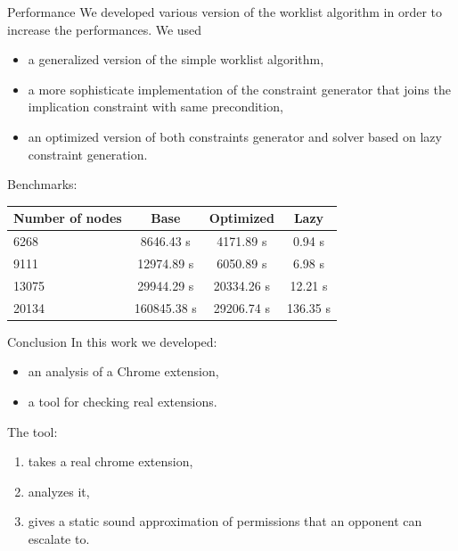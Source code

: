 \documentclass[11pt]{beamer}
\begin{document}
\begin{frame}{Performance}
We developed various version of the worklist algorithm in order to increase the performances. We used
\begin{itemize}
\item a generalized version of the simple worklist algorithm,
\item a more sophisticate implementation of the constraint generator that joins the implication constraint with same precondition,
\item an optimized version of both constraints generator and solver based on lazy constraint generation.
\end{itemize}

Benchmarks:
\begin{center}
\begin{tabular}{|l|c|c|c|}
\hline
Number of nodes & Base & Optimized & Lazy\\
\hline
6268 & 8646.43 s & 4171.89 s & 0.94 s\\
\hline
9111 & 12974.89 s & 6050.89 s & 6.98 s\\
\hline
13075 & 29944.29 s & 20334.26 s & 12.21 s\\
\hline
20134 & 160845.38 s & 29206.74 s & 136.35 s\\
\hline
\end{tabular}
\end{center}

\end{frame}

\begin{frame}{Conclusion}
In this work we developed:
\begin{itemize}
\item an analysis of a Chrome extension,
\item a tool for checking real extensions.
\end{itemize}

The tool:
\begin{enumerate}
\item takes a real chrome extension,
\item analyzes it,
\item gives a static sound approximation of permissions that an opponent can escalate to.
\end{enumerate}
\end{frame}
\end{document}
